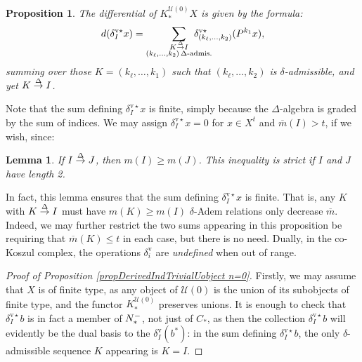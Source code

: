\documentclass[11pt]{amsart} \renewcommand{\baselinestretch}{1.2}
\theoremstyle{plain}
\newtheorem{lem}[thm]{Lemma}
\newtheorem{prop}[thm]{Proposition}
\numberwithin{equation}{section} %
\theoremstyle{plain}
\newtheorem{lem}[thm]{Lemma}
\newtheorem{prop}[thm]{Proposition}
\numberwithin{equation}{chapter} %
\newcommand{\calU}{\mathcal{U}}
\newcommand{\deltaalg}{\Delta} %
\newcommand{\minDimP}{\overline{m}}
\newcommand{\minDimDelta}{m}
\newcommand{\produces}[3]{#3:#1\sim #2}
\renewcommand{\produces}[3]{#1\rightarrow_{#3} #2}%
\renewcommand{\produces}[3]{#1\overset{\smash{#3}}{\rightarrow} #2}%
\newcommand{\Nop}{N^{\smash{-}}}
\newcommand{\uver}{^\mathrm{v}}
\newcommand{\deltav}{\delta\uver}
\newcommand{\deltavstar}{\delta^{\mathrm{v}\star}}
\begin{document}
\begin{Koszul complexes}
\begin{prop}
The differential of $K^{\calU(0)}_*X$ is given by the formula:
\[d(\deltavstar_Ix)=\sum_{ \substack{\produces{K}{I}{\deltaalg}\\(k_{\ell},\ldots,k_2){\,\deltaalg\textup{-admis.}}}}\!\!\!\!\!\!\!\!\!\!\!\! \deltavstar_{(k_{\ell},\ldots,k_2)}(P^{k_1}x),\]
summing over those $K=(k_{\ell},\ldots,k_1)$ such that $(k_{\ell},\ldots,k_2)$ is $\delta$-admissible, and yet $\produces{K}{I}{\deltaalg}$.
\end{prop}
Note that the sum defining $\deltavstar_Ix$ is finite, simply because the $\Delta$-algebra is graded by the sum of indices.
We may assign $\deltavstar_Ix=0$ for $x\in X^t$ and $\minDimP(I)>t$, if we wish, since:
\begin{lem}
\label{lemOnAdemChangeIn minDimP}
If $\produces{I}{J}{\deltaalg}$, then $\minDimDelta(I)\geq\minDimDelta(J)$. This inequality is strict if $I$ and $J$ have length 2.
\end{lem}
\noindent In fact, this lemma ensures that the sum defining $\deltavstar_Ix$ is finite. That is, any $K$ with $\produces{K}{I}{\Delta}$ must have  $\minDimDelta(K)\geq\minDimDelta(I)$
 $\delta$-Adem relations only decrease $\minDimP$. Indeed, we may further restrict the two sums appearing in this proposition be requiring that $\minDimP(K)\leq t$ in each case, but there is no need. Dually, in the co-Koszul complex, the operations $\deltav_i$ are \emph{undefined} when out of range.
\begin{proof}[Proof of Proposition \ref{propDerivedIndTrivialUobject n=0}]
Firstly, we may assume that $X$ is  of finite type, as any object of $\calU(0)$ is the union of its  subobjects of finite type, and the functor $K_*^{\calU(0)}$ preserves unions. It is enough to check that $\deltavstar_Ib$ is in fact a member of $\Nop_*$, not just of $C_*$, as then the collection $\deltavstar_Ib$ will evidently be the dual basis to the $\deltav_I(b^*)$: in the sum defining $\deltavstar_Ib$, the only $\delta$-admissible sequence $K$ appearing is $K=I$.  %


\end{proof}
\end{Koszul complexes}
\end{document}
